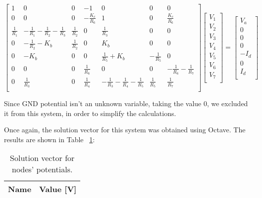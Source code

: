 \[
{\begin{bmatrix}
1 & 0 & 0 & -1 & 0 & 0 & 0\\
0 & 0 & 0 & -\frac{K_c}{R_6} & 1 & 0 & \frac{K_c}{R_6}\\
\frac{1}{R_1} & -\frac{1}{R_1}-\frac{1}{R_2}-\frac{1}{R_3} & \frac{1}{R_2} & 0 & \frac{1}{R_3} & 0 & 0\\
0 & -\frac{1}{R_2}-K_b & \frac{1}{R_2} & 0 & K_b & 0 & 0\\
0 & -K_b & 0 & 0 & \frac{1}{R_5}+K_b & -\frac{1}{R_5} & 0\\
0 & 0 & 0 & \frac{1}{R_6} & 0 & 0 & -\frac{1}{R_6}-\frac{1}{R_7}\\
0 & \frac{1}{R_3} & 0 & \frac{1}{R_4} & -\frac{1}{R_3}-\frac{1}{R_4}-\frac{1}{R_5} & \frac{1}{R_5} & \frac{1}{R_7}\\
            \end{bmatrix}
            }
{\begin{bmatrix}
V_1\\
V_2\\
V_3\\
V_4\\
V_5\\
V_6\\
V_7\\
            \end{bmatrix}
            }
    =
{\begin{bmatrix}
V_a\\
0\\
0\\
0\\
-I_d\\
0\\
I_d\\
            \end{bmatrix}
            }
\]

Since GND potential isn't an unknown variable, taking the value 0, we excluded it from this system, in order to simplify the calculations.

Once again, the solution vector for this system was obtained using Octave. The results are shown in Table ~\ref{tab:nodetab}:

\begin{table}[H]
  \centering
  \begin{tabular}{|l|r|}
    \hline    
    {\bf Name} & {\bf Value [V]} \\ \hline
    
  \end{tabular}
  \caption{Solution vector for nodes' potentials.}
  \label{tab:nodetab}
\end{table}

